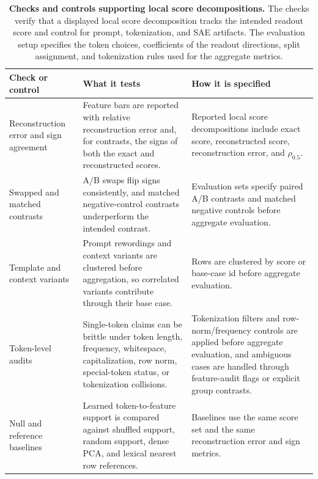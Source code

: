 \begin{table}[!tbp]
\caption{\textbf{Checks and controls supporting local score decompositions.}
The checks verify that a displayed local score decomposition tracks the intended
readout score and control for prompt, tokenization, and SAE artifacts. The
evaluation setup specifies the token choices, coefficients of the readout directions, split
assignment, and tokenization rules used for the aggregate metrics.}
\label{tab:app-robustness-control-ledger}
\centering
\footnotesize
\setlength{\tabcolsep}{3pt}
\renewcommand{\arraystretch}{1.08}
\begin{tabularx}{\textwidth}{@{}>{\RaggedRight\arraybackslash}p{}Y Y@{}}
\toprule
Check or control & What it tests & How it is specified \\
\midrule
Reconstruction error and sign agreement &
Feature bars are reported with relative reconstruction error and, for contrasts, the
signs of both the exact and reconstructed scores. &
Reported local score decompositions include exact score, reconstructed score,
reconstruction error, and \(\rho_{0.5}\). \\
\addlinespace
Swapped and matched contrasts &
A/B swaps flip signs consistently, and matched negative-control contrasts
underperform the intended contrast. &
Evaluation sets specify paired A/B contrasts and matched negative controls before
aggregate evaluation. \\
\addlinespace
Template and context variants &
Prompt rewordings and context variants are clustered before aggregation, so
correlated variants contribute through their base case. &
Rows are clustered by score or base-case id before aggregate evaluation. \\
\addlinespace
Token-level audits &
Single-token claims can be brittle under token length, frequency, whitespace,
capitalization, row norm, special-token status, or tokenization collisions. &
Tokenization filters and row-norm/frequency controls are applied before
aggregate evaluation, and ambiguous cases are handled through feature-audit flags or
explicit group contrasts. \\
\addlinespace
Null and reference baselines &
Learned token-to-feature support is compared against shuffled support, random
support, dense PCA, and lexical nearest row references. &
Baselines use the same score set and the same reconstruction error and sign
metrics. \\
\bottomrule
\end{tabularx}
\end{table}

